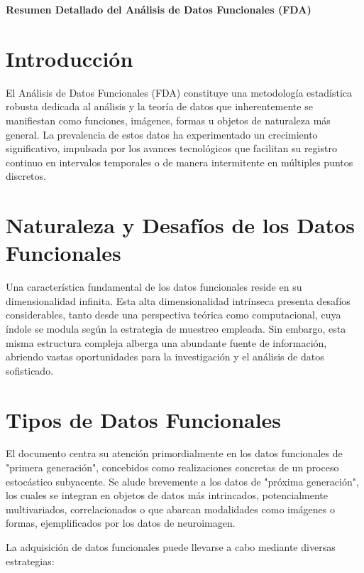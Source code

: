 \documentclass{article}
\begin{document}
\noindent\textbf{\Large Resumen Detallado del Análisis de Datos Funcionales (FDA)}


\section*{\large Introducción}
El Análisis de Datos Funcionales (FDA) constituye una metodología estadística robusta dedicada al análisis y la teoría de datos que inherentemente se manifiestan como funciones, imágenes, formas u objetos de naturaleza más general. La prevalencia de estos datos ha experimentado un crecimiento significativo, impulsada por los avances tecnológicos que facilitan su registro continuo en intervalos temporales o de manera intermitente en múltiples puntos discretos.

\section*{\large Naturaleza y Desafíos de los Datos Funcionales}
Una característica fundamental de los datos funcionales reside en su dimensionalidad infinita. Esta alta dimensionalidad intrínseca presenta desafíos considerables, tanto desde una perspectiva teórica como computacional, cuya índole se modula según la estrategia de muestreo empleada. Sin embargo, esta misma estructura compleja alberga una abundante fuente de información, abriendo vastas oportunidades para la investigación y el análisis de datos sofisticado.

\section*{\large Tipos de Datos Funcionales}
El documento centra su atención primordialmente en los datos funcionales de "primera generación", concebidos como realizaciones concretas de un proceso estocástico subyacente. Se alude brevemente a los datos de "próxima generación", los cuales se integran en objetos de datos más intrincados, potencialmente multivariados, correlacionados o que abarcan modalidades como imágenes o formas, ejemplificados por los datos de neuroimagen.

La adquisición de datos funcionales puede llevarse a cabo mediante diversas estrategias:
\end{document}
